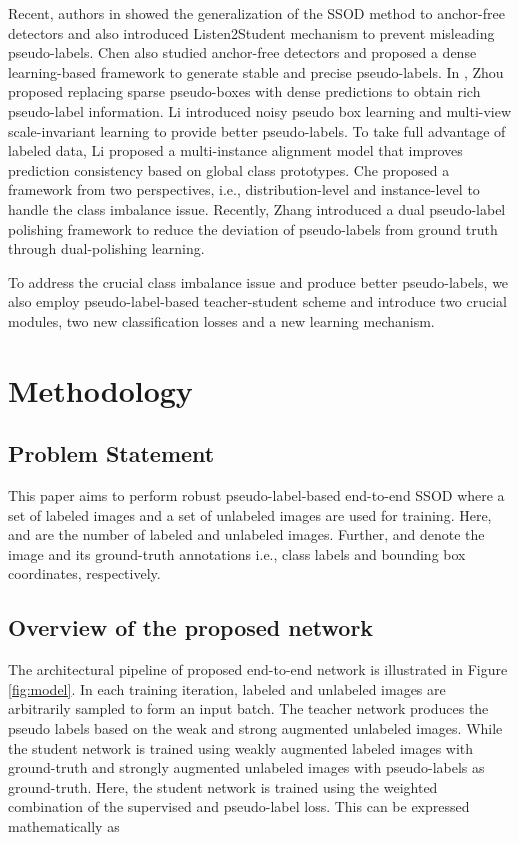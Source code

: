 \documentclass[10pt,twocolumn,letterpaper]{article}
\begin{document}
Recent, authors in \cite{Unbiasedv2} showed the generalization of the SSOD method to anchor-free detectors and also introduced Listen2Student mechanism to prevent misleading pseudo-labels. Chen \etal \cite{DSL} also studied anchor-free detectors and proposed a dense learning-based framework to generate stable and precise pseudo-labels. In \cite{DenseTeacher}, Zhou \etal proposed replacing sparse pseudo-boxes with dense predictions to obtain rich pseudo-label information. Li \etal \cite{PseCo} introduced noisy pseudo box learning and multi-view scale-invariant learning to provide better pseudo-labels. To take full advantage of labeled data, Li \etal \cite{MAGCP} proposed a multi-instance alignment model that improves prediction consistency based on global class prototypes. Che \etal \cite{LabelMatch} proposed a framework from two perspectives, i.e., distribution-level and instance-level to handle the class imbalance issue. Recently, Zhang \etal \cite{PoshingTeacher} introduced a dual pseudo-label polishing framework to reduce the deviation of pseudo-labels from ground truth through dual-polishing learning.

To address the crucial class imbalance issue and produce better pseudo-labels, we also employ pseudo-label-based teacher-student scheme
and introduce two crucial modules, two new classification losses and a new learning mechanism. 


\section{Methodology}
\subsection{Problem Statement}
This paper aims to perform robust pseudo-label-based end-to-end SSOD where a set of labeled images  
and a set of unlabeled images  are used for training. Here,  and  are the number of labeled and unlabeled images. Further,  and  denote the image and its ground-truth annotations i.e., class labels and bounding box coordinates, respectively.

\subsection{Overview of the proposed network}
The architectural pipeline of proposed end-to-end network is illustrated in Figure \ref{fig:model}. 
In each training iteration, labeled and unlabeled images are arbitrarily sampled to form an input batch. The teacher network produces the pseudo labels based on the weak and strong augmented unlabeled images. While the student network is trained using weakly augmented labeled images with ground-truth and strongly augmented unlabeled images with pseudo-labels as ground-truth. Here, the student network is trained using the weighted combination of the supervised and pseudo-label loss. This can be expressed mathematically as
\end{document}
